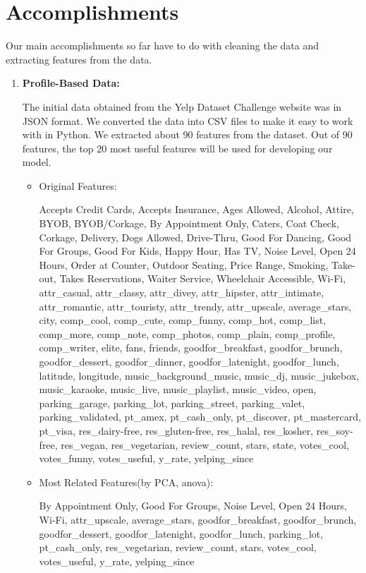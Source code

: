 \documentclass[12pt]{article}
\begin{document}
\section*{Accomplishments}
Our main accomplishments so far have to do with cleaning the data and extracting features from the data.
\begin{enumerate}
\item 
\textbf{Profile-Based Data:}

\noindent The initial data obtained from the Yelp Dataset Challenge website was in JSON format. We converted the data into CSV files to make it easy to work with in Python. We extracted about 90 features from the dataset. Out of 90 features, the top 20 most useful features will be used for developing our model.


\begin{itemize}
\item Original Features:$\qquad$ \begin{flushleft}Accepts Credit Cards, Accepts Insurance, Ages Allowed, Alcohol, Attire, BYOB, BYOB/Corkage, By Appointment Only, Caters, Coat Check, Corkage, Delivery, Dogs Allowed, Drive-Thru, Good For Dancing, Good For Groups, Good For Kids, Happy Hour, Has TV, Noise Level, Open 24 Hours, Order at Counter, Outdoor Seating, Price Range, Smoking, Take-out, Takes Reservations, Waiter Service, Wheelchair Accessible, Wi-Fi, attr\_casual, attr\_classy, attr\_divey, attr\_hipster, attr\_intimate, attr\_romantic, attr\_touristy, attr\_trendy, attr\_upscale, average\_stars, city, comp\_cool, comp\_cute, comp\_funny, comp\_hot, comp\_list, comp\_more, comp\_note, comp\_photos, comp\_plain, comp\_profile, comp\_writer, elite, fans, friends, goodfor\_breakfast, goodfor\_brunch, goodfor\_dessert, goodfor\_dinner, goodfor\_latenight, goodfor\_lunch, latitude, longitude, music\_background\_music, music\_dj, music\_jukebox, music\_karaoke, music\_live, music\_playlist, music\_video, open, parking\_garage, parking\_lot, parking\_street, parking\_valet, parking\_validated, pt\_amex, pt\_cash\_only, pt\_discover, pt\_mastercard, pt\_visa, res\_dairy-free, res\_gluten-free, res\_halal, res\_kosher, res\_soy-free, res\_vegan, res\_vegetarian, review\_count, stars, state, votes\_cool, votes\_funny, votes\_useful, y\_rate, yelping\_since\end{flushleft}

\item Most Related Features(by PCA, anova):$\qquad$ \begin{flushleft}By Appointment Only, Good For Groups, Noise Level, Open 24 Hours, Wi-Fi, attr\_upscale, average\_stars, goodfor\_breakfast, goodfor\_brunch, goodfor\_dessert, goodfor\_latenight, goodfor\_lunch, parking\_lot, pt\_cash\_only, res\_vegetarian, review\_count, stars, votes\_cool, votes\_useful, y\_rate, yelping\_since\end{flushleft}


\end{itemize}
\end{enumerate}
\end{document}
